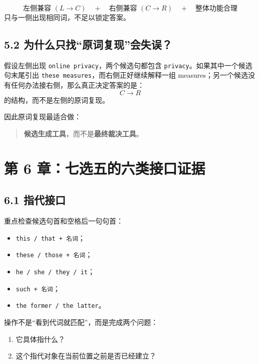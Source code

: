 \documentclass[11pt,a4paper]{ctexart}
\newcommand{\kw}[1]{\textbf{#1}}
\begin{document}
\begin{center}
\end{center}

\begin{corebox}[七选五核心检查式]
\[
\boxed{
\text{左侧兼容 } (L \to C)
\quad + \quad
\text{右侧兼容 } (C \to R)
\quad + \quad
\text{整体功能合理}
}
\]
只与一侧出现相同词，不足以锁定答案。
\end{corebox}

\subsection{5.2 为什么只找“原词复现”会失误？}
假设左侧出现 \texttt{online privacy}，两个候选句都包含 \texttt{privacy}。如果其中一个候选句末尾引出 \texttt{these measures}，而右侧正好继续解释一组 measures；另一个候选没有任何办法接右侧，那么真正决定答案的是：
\[
C\rightarrow R
\]
的结构，而不是左侧的原词复现。

因此原词复现最适合做：
\begin{quote}
\kw{候选生成工具}，而不是\kw{最终裁决工具}。
\end{quote}

\section{第 6 章：七选五的六类接口证据}

\subsection{6.1 指代接口}
重点检查候选句首和空格后一句句首：
\begin{itemize}
  \item \texttt{this / that + 名词}；
  \item \texttt{these / those + 名词}；
  \item \texttt{he / she / they / it}；
  \item \texttt{such + 名词}；
  \item \texttt{the former / the latter}。
\end{itemize}
操作不是“看到代词就匹配”，而是完成两个问题：
\begin{enumerate}
  \item 它具体指什么？
  \item 这个指代对象在当前位置之前是否已经建立？
\end{enumerate}
\end{document}
